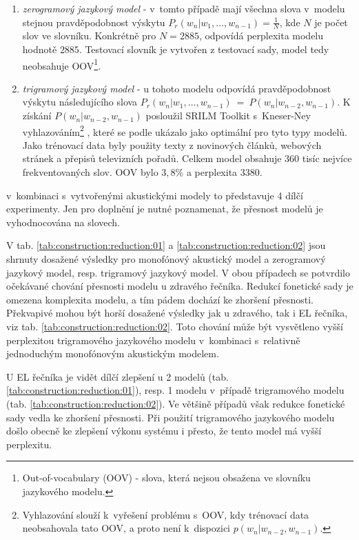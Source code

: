 \begin{enumerate}
  \item \textit{zerogramový jazykový model} - v~tomto případě mají všechna slova v~modelu stejnou pravděpodobnost výskytu $P_r(w_n|w_1,\dots,w_{n-1}) = \frac{1}{N}$, kde $N$ je počet slov ve slovníku. Konkrétně pro $N = 2885$, odpovídá perplexita modelu hodnotě $2885$. Testovací slovník je vytvořen z testovací sady, model tedy neobsahuje OOV\footnote{Out-of-vocabulary (OOV) - slova, která nejsou obsažena ve slovníku jazykového modelu.}.
  \item \textit{trigramový jazykový model} - u tohoto modelu odpovídá pravděpodobnost výskytu následujícího slova $P_r(w_n|w_1,\dots,w_{n-1})~=~P(w_n|w_{n-2}, w_{n-1})$. K získání $P(w_n|w_{n-2}, w_{n-1})$ posloužil SRILM Toolkit s~Kneser-Ney vyhlazováním\footnote{Vyhlazování slouží  k~vyřešení problému s~OOV, kdy trénovací data neobsahovala tato OOV, a proto není  k~dispozici $p(w_n|w_{n-2}, w_{n-1})$.} \cite{Stolcke2002}, které se podle \cite{Prazak2008} ukázalo jako optimální pro tyto typy modelů. Jako trénovací data byly použity texty z novinových článků, webových stránek a přepisů televizních pořadů. Celkem model obsahuje 360 tisíc nejvíce frekventovaných slov. OOV bylo $3,8 \%$ a perplexita $3380$.
\end{enumerate}

\noindent v~kombinaci s~vytvořenými akustickými modely to představuje 4 dílčí experimenty.
Jen pro doplnění je nutné poznamenat, že přesnost modelů je vyhodnocována na slovech.

V tab. \ref{tab:construction:reduction:01} a \ref{tab:construction:reduction:02} jsou shrnuty dosažené výsledky pro monofónový akustický model a zerogramový jazykový model, resp. trigramový jazykový model.
V obou případech se potvrdilo očekávané chování přesnosti modelu u zdravého řečníka.
Redukcí fonetické sady je omezena komplexita modelu, a tím pádem dochází ke zhoršení přesnosti.
Překvapivé mohou být horší dosažené výsledky jak u zdravého, tak i EL řečníka, viz tab. \ref{tab:construction:reduction:02}.
Toto chování může být vysvětleno vyšší perplexitou trigramového jazykového modelu v~kombinaci s~relativně jednoduchým monofónovým akustickým modelem.

U EL řečníka je vidět dílčí zlepšení u 2 modelů (tab. \ref{tab:construction:reduction:01}), resp. 1 modelu v~případě trigramového modelu (tab. \ref{tab:construction:reduction:02}).
Ve většině případů však redukce fonetické sady vedla ke zhoršení přesnosti.
Při použití trigramového jazykového modelu došlo obecně ke zlepšení výkonu systému i přesto, že tento model má vyšší perplexitu.

